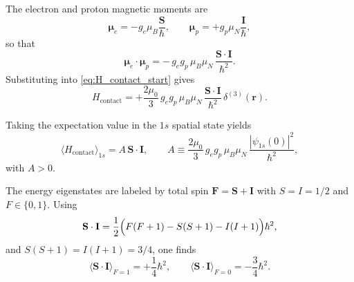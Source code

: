 \documentclass[11pt,a4paper]{article}
\begin{document}
            The electron and proton magnetic moments are
            \begin{equation}
                \boldsymbol{\mu}_e = -g_e \mu_B \frac{\mathbf{S}}{\hbar},
                \qquad
                \boldsymbol{\mu}_p = +g_p \mu_N \frac{\mathbf{I}}{\hbar},
                \label{eq:moments_def_repeat}
            \end{equation}
            so that
            \begin{equation}
                \boldsymbol{\mu}_e\cdot \boldsymbol{\mu}_p
                =
                -\,g_e g_p\,\mu_B\mu_N\,\frac{\mathbf{S}\cdot \mathbf{I}}{\hbar^2}.
            \end{equation}
            Substituting into \eqref{eq:H_contact_start} gives
            \begin{equation}
                H_{\mathrm{contact}}
                =
                +\frac{2\mu_0}{3}\,g_e g_p\,\mu_B\mu_N\,
                \frac{\mathbf{S}\cdot\mathbf{I}}{\hbar^2}\,\delta^{(3)}(\mathbf{r}).
                \label{eq:H_Fermi_SI}
            \end{equation}
            
            Taking the expectation value in the $1s$ spatial state yields
            \begin{equation}
                \langle H_{\mathrm{contact}}\rangle_{1s}
                =
                A\,\mathbf{S}\cdot\mathbf{I},
                \qquad
                A
                \equiv
                \frac{2\mu_0}{3}\,g_e g_p\,\mu_B\mu_N\,
                \frac{|\psi_{1s}(0)|^2}{\hbar^2},
                \label{eq:A_def}
            \end{equation}
            with $A>0$.
            
            The energy eigenstates are labeled by total spin $\mathbf{F}=\mathbf{S}+\mathbf{I}$ with $S=I=1/2$ and $F\in\{0,1\}$.
            Using
            \begin{equation}
                \mathbf{S}\cdot\mathbf{I}
                =
                \frac{1}{2}\Bigl(F(F+1)-S(S+1)-I(I+1)\Bigr)\hbar^2,
                \label{eq:SdotI}
            \end{equation}
            and $S(S+1)=I(I+1)=3/4$, one finds
            \begin{equation}
                \langle \mathbf{S}\cdot\mathbf{I}\rangle_{F=1}=+\frac{1}{4}\hbar^2,
                \qquad
                \langle \mathbf{S}\cdot\mathbf{I}\rangle_{F=0}=-\frac{3}{4}\hbar^2.
            \end{equation}
            
\end{document}
